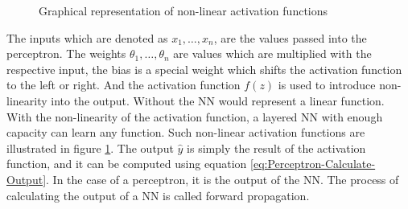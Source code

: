 \begin{figure}[htbp]
    \centering
    \caption{Graphical representation of non-linear activation functions}
    \label{fig:Activation-Functions}
\end{figure}
\noindent
The inputs which are denoted as $x_1, \dots, x_n$, are the values passed into the perceptron. The weights $\theta_{1}, \dots, \theta_{n}$ are values which are multiplied with the respective input, the bias is a special weight which shifts the activation function to the left or right. And the activation function $f(z)$ is used to introduce non-linearity into the output. Without the \gls{NN} would represent a linear function. With the non-linearity of the activation function, a layered \gls{NN} with enough capacity can learn any function. Such non-linear activation functions are illustrated in figure \ref{fig:Activation-Functions}. The output $\hat{y}$ is simply the result of the activation function, and it can be computed using equation \ref{eq:Perceptron-Calculate-Output}. In the case of a perceptron, it is the output of the \gls{NN}. The process of calculating the output of a \gls{NN} is called forward propagation.
